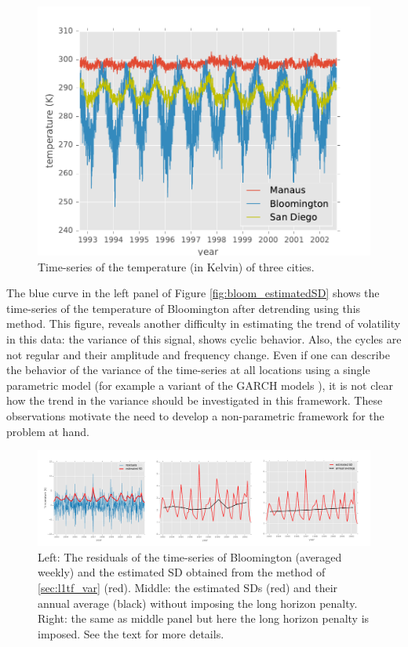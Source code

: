 \documentclass{article}
\begin{document}
\begin{figure}[tb]
	\centering
	\includegraphics[width=.2\textheight]{Figures/cities_ts}
 	\caption{Time-series of the temperature (in Kelvin) of three cities.}
 	\label{fig:cities_ts}
\end{figure} 

The blue curve in the left panel of Figure \autoref{fig:bloom_estimatedSD} shows the time-series of the temperature of Bloomington after detrending using this method. This figure, reveals another difficulty in estimating the trend of volatility in this data: the variance of this signal, shows cyclic behavior. Also, the cycles are not regular and their amplitude and frequency change. Even if one can describe the behavior of the variance of the time-series at all locations using a single parametric model (for example a variant of the GARCH models \citep{bollerslev_generalized_1986}), it is not clear how the trend in the variance should be investigated in this framework. These observations motivate the need to develop a non-parametric framework for the problem at hand.

\begin{figure}[tb]
  \centering
  \includegraphics[width=\columnwidth]{Figures/bloom_estimatedSD}
  \caption{Left: The residuals of the time-series of Bloomington
    (averaged weekly) and the estimated SD obtained from the method of
    \autoref{sec:l1tf_var} (red). Middle: the estimated SDs (red) and
    their annual average (black) without imposing the long horizon
    penalty. Right: the same as middle panel but here the long horizon
    penalty is imposed. See the text for more details.} 
  \label{fig:bloom_estimatedSD}
\end{figure} 
\end{document}
